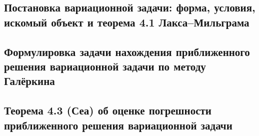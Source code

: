 \documentclass[a4paper,14pt]{article} %
\begin{document}
\subsection{Постановка вариационной задачи: форма, условия, искомый объект и теорема 4.1 Лакса--Мильграма}

\subsection{Формулировка задачи нахождения приближенного решения вариационной задачи по методу Галёркина}

\subsection{Теорема 4.3 (Сеа) об оценке погрешности приближенного решения вариационной задачи}
\end{document}
